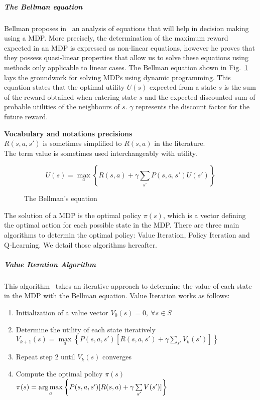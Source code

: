 \subparagraph{The Bellman equation}
Bellman proposes in~\cite{bellman1957} an analysis of equations that will help in decision making using a MDP. 
More precisely, the determination of the maximum reward expected in an MDP is expressed as non-linear equations, however he proves that they possess quasi-linear properties that allow us to solve these equations using methods only applicable to linear cases. 
The Bellman equation shown in Fig.~\ref{fig:bellmaneq} lays the groundwork for solving MDPs using dynamic programming.
This equation states that the optimal utility $U(s)$ expected from a state $s$ is the sum of the reward obtained when entering state $s$ and the expected discounted sum of probable utilities of the neighbours of $s$. $\gamma$ represents the discount factor for the future reward.

\textbf{Vocabulary and notations precisions}\\
$R(s,a,s')$ is sometimes simplified to $R(s,a)$ in the literature.\\
The term value is sometimes used interchangeably with utility.

\begin{figure}[h]
\[ U(s) = \max\limits_a \left \{R(s,a) + \gamma   \sum\limits_{s'} P(s,a,s')U(s') \right \} \]


\caption{The Bellman's equation}
\label{fig:bellmaneq}
\end{figure}

The solution of a MDP is the optimal policy $\pi(s)$, which is a vector defining the optimal action for each possible state in the MDP.
There are three main algorithms to determin the optimal policy: Value Iteration, Policy Iteration and Q-Learning.
We detail those algorithms hereafter.


\subparagraph{Value Iteration Algorithm}
This algorithm~\cite{bellman1957} takes an iterative approach to determine the value of each state in the MDP with the Bellman equation.
Value Iteration works as follows:
\begin{enumerate}
    \item Initialization of a value vector $V_0(s)=0,~\forall s\in S$
    \item Determine the utility of each state iteratively\\{$V_{k+1}(s) = \max\limits_a \left \{ P(s,a,s')[R(s,a,s') + \gamma \sum\limits_{s'}V_k(s')] \right \}$}
    \item Repeat step 2 until $V_{k}(s)$ converges
    \item Compute the optimal policy $\pi(s)$\\$\pi(s) = \operatorname*{arg\,max}\limits_a \left \{P(s,a,s')[R(s,a) + \gamma \sum\limits_{s'}V(s')] \right \}$
\end{enumerate}

